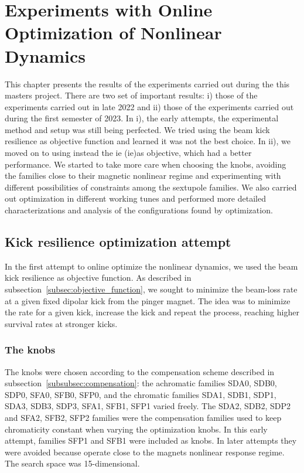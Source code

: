 \chapter{Experiments with Online Optimization of Nonlinear Dynamics}
This chapter presents the results of the experiments carried out during the this masters project. There are two set of important results: i) those of the experiments carried out in late 2022 and ii) those of the experiments carried out during the first semester of 2023. In i), the early attempts, the experimental method and setup was still being perfected. We tried using the beam kick resilience as objective function and learned it was not the best choice. In ii), we moved on to using instead the \gls*{ie} (\gls*{ie})as objective, which had a better performance.  We started to take more care when choosing the knobs, avoiding the families close to their magnetic nonlinear regime and experimenting with different possibilities of constraints among the sextupole families. We also carried out optimization in different working tunes and performed more detailed characterizations and analysis of the configurations found by optimization.
\section{Kick resilience optimization attempt}
\label{sec:kick_res_opt}
In the first attempt to online optimize the nonlinear dynamics, we used the beam kick resilience as objective function. As described in subsection~\ref{subsec:objective_function}, we sought to minimize the beam-loss rate at a given fixed dipolar kick from the pinger magnet. The idea was to minimize the rate for a given kick, increase the kick and repeat the process, reaching higher survival rates at stronger kicks.
\subsection{The knobs}
The knobs were chosen according to the compensation scheme described in subsection~\ref{subsubsec:compensation}: the achromatic families SDA0, SDB0, SDP0, SFA0, SFB0, SFP0, and the chromatic families SDA1, SDB1, SDP1, SDA3, SDB3, SDP3, SFA1, SFB1, SFP1 varied freely. The SDA2, SDB2, SDP2 and SFA2, SFB2, SFP2 families were the compensation families used to keep chromaticity constant when varying the optimization knobs. In this early attempt, families SFP1 and SFB1 were included as knobs. In later attempts they were avoided because operate close to the magnets nonlinear response regime. The search space was 15-dimensional.
